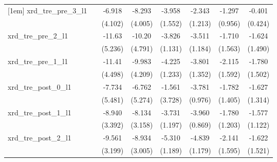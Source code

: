 {\begin{tabular}{l*{7}{c}}
[1em]
xrd\_tre\_pre\_3\_l1&                     &      -6.918         &      -8.293\sym{*}  &      -3.958\sym{*}  &      -2.343         &      -1.297         &      -0.401         \\
            &                     &     (4.102)         &     (4.005)         &     (1.552)         &     (1.213)         &     (0.956)         &     (0.424)         \\
[1em]
xrd\_tre\_pre\_2\_l1&                     &      -11.63\sym{*}  &      -10.20\sym{*}  &      -3.826\sym{**} &      -3.511\sym{**} &      -1.710         &      -1.624         \\
            &                     &     (5.236)         &     (4.791)         &     (1.131)         &     (1.184)         &     (1.563)         &     (1.490)         \\
[1em]
xrd\_tre\_pre\_1\_l1&                     &      -11.41\sym{*}  &      -9.983\sym{*}  &      -4.225\sym{**} &      -3.801\sym{**} &      -2.115         &      -1.780         \\
            &                     &     (4.498)         &     (4.209)         &     (1.233)         &     (1.352)         &     (1.592)         &     (1.502)         \\
[1em]
xrd\_tre\_post\_0\_l1&                     &      -7.734         &      -6.762         &      -1.561         &      -3.781\sym{***}&      -1.782         &      -1.627         \\
            &                     &     (5.481)         &     (5.274)         &     (3.728)         &     (0.976)         &     (1.405)         &     (1.314)         \\
[1em]
xrd\_tre\_post\_1\_l1&                     &      -8.940\sym{*}  &      -8.134\sym{*}  &      -3.731\sym{**} &      -3.960\sym{***}&      -1.780         &      -1.577         \\
            &                     &     (3.392)         &     (3.158)         &     (1.197)         &     (0.869)         &     (1.203)         &     (1.122)         \\
[1em]
xrd\_tre\_post\_2\_l1&                     &      -9.561\sym{**} &      -8.934\sym{**} &      -5.310\sym{***}&      -4.839\sym{***}&      -2.141         &      -1.622         \\
            &                     &     (3.199)         &     (3.005)         &     (1.189)         &     (1.179)         &     (1.595)         &     (1.521)         \\
[1em]

\end{tabular}}
